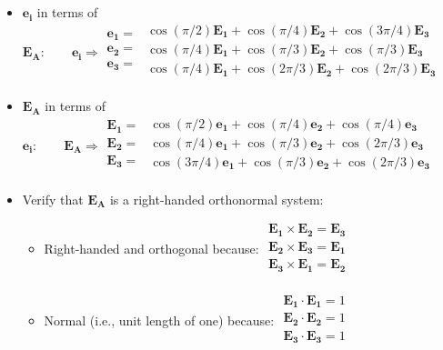 \documentclass[10pt, letterpaper]{article}
\begin{document}
    	\subsection{}
		\begin{itemize}			
			\item $ \bm{e_i}$ in terms of $\bm{E_A}: \qquad \bm{e_i} \Rightarrow \begin{matrix} 
				\bm{e_1}  = \\ \bm{e_2} = \\ \bm{e_3} = \\ 
				\end{matrix} \begin{matrix}
				\cos (\pi/2) \bm{E_1} + \cos(\pi/4) \bm{E_2} + \cos(3 \pi / 4) \bm{E_3} \\
				\cos (\pi/4) \bm{E_1} + \cos(\pi/3) \bm{E_2} + \cos(\pi /3) \bm{E_3} \\
				\cos (\pi/4) \bm{E_1} + \cos(2\pi/3) \bm{E_2} + \cos(2 \pi /3) \bm{E_3} \\
					\end{matrix}$ 
					
			\item $ \bm{E_A}$ in terms of $\bm{e_i}: \qquad \bm{E_A} \Rightarrow \begin{matrix} 
				\bm{E_1}  = \\ \bm{E_2} = \\ \bm{E_3} = \\ 
				\end{matrix} \begin{matrix}
				\cos (\pi/2) \bm{e_1} + \cos(\pi/4) \bm{e_2} + \cos( \pi / 4) \bm{e_3} \\
				\cos (\pi/4) \bm{e_1} + \cos(\pi/3) \bm{e_2} + \cos(2\pi /3) \bm{e_3} \\
				\cos (3\pi/4) \bm{e_1} + \cos(\pi/3) \bm{e_2} + \cos(2 \pi /3) \bm{e_3} \\
					\end{matrix}$ 
					
			\item Verify that $\bm{E_A}$ is a right-handed orthonormal system: 
				\begin{itemize}
					\item Right-handed and orthogonal because:
						$\begin{matrix}
						 \bm{E_1} \times \bm{E_2} = \bm{E_3} \\
						 \bm{E_2} \times \bm{E_3} = \bm{E_1} \\
						 \bm{E_3} \times \bm{E_1} = \bm{E_2} \\
						 \end{matrix}$
				
					\item Normal (i.e., unit length of one) because:
						$\begin{matrix}
						 \bm{E_1} \cdot \bm{E_1} = 1 \\
						 \bm{E_2} \cdot \bm{E_2} = 1 \\
						 \bm{E_3} \cdot \bm{E_3} = 1 \\
						 \end{matrix}$
				\end{itemize}
		\end{itemize}
\end{document}

